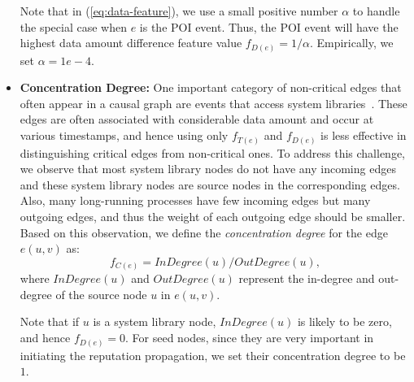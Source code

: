 \begin{itemize}[noitemsep, topsep=1pt, partopsep=1pt, listparindent=\parindent, leftmargin=*]
Note that in (\ref{eq:data-feature}), we use a small positive number $\alpha$ to handle the special case when $e$ is the POI event. Thus, the POI event will have the highest data amount difference feature value $f_{D(e)} = 1/\alpha$. Empirically, we set $\alpha = 1e-4$.


\item \textbf{Concentration Degree:}
One important category of non-critical edges that often appear in a causal graph are events that access system libraries~\cite{reduction,reduction2}. These edges are often associated with considerable data amount and occur at various timestamps, and hence using only $f_{T(e)}$ and $f_{D(e)}$ is less effective in distinguishing critical edges from non-critical ones.
To address this challenge, we observe that most system library nodes do not have any incoming edges and these system library nodes are source nodes in the corresponding edges. 
Also, many long-running processes have few incoming edges but many outgoing edges, and thus the weight of each outgoing edge should be smaller.
Based on this observation, we define the \emph{concentration degree} for the edge $e(u, v)$ as:
\begin{equation}
    \label{eq:structure-feature}
    f_{C(e)} = InDegree(u)/OutDegree(u),
\end{equation}
where $InDegree(u)$ and $OutDegree(u)$ represent the in-degree and out-degree of the source node $u$ in $e(u,v)$.


Note that if $u$ is a system library node, $InDegree(u)$ is likely to be zero, and hence $f_{D(e)} = 0$. 
For seed nodes, since they are very important in initiating the reputation propagation, we set their concentration degree to be $1$.


\end{itemize}




